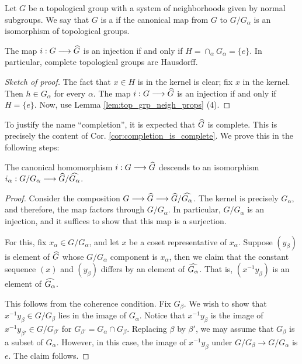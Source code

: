 \begin{defn}
Let $G$ be a topological group with a system of neighborhoods
given by normal subgroups. We say that $G$ is a  if the canonical
map from $G$ to $G/G_\alpha$ is an isomorphism of topological
groups.
\end{defn}

\begin{prop}
The map $i: G \longrightarrow \widehat{G}$ is an injection if and only if
$H = \cap_\alpha G_\alpha = \{e\}$. In particular, complete 
topological groups are Hausdorff.
\end{prop}
\begin{proof}[Sketch of proof]
The fact that $x \in H$ is in the kernel is clear; fix $x$ in
the kernel. Then $h \in G_\alpha$ for every $\alpha$. The map $i: 
G \longrightarrow \widehat{G}$ is an injection if and only if $H = \{e\}$. 
Now, use Lemma \ref{lem:top_grp_neigh_props} (4).
\end{proof}

To justify the name ``completion'', it is expected that 
$\widehat{G}$ is complete. This is precisely the content of Cor. 
\ref{cor:completion_is_complete}. We prove this in the following 
steps:

\begin{prop}
The canonical homomorphism $i: G \longrightarrow \widehat{G}$ descends to an 
isomorphism $i_\alpha: G/G_\alpha \longrightarrow 
\widehat{G}/\widehat{G_\alpha}$.
\end{prop}
\begin{proof}
Consider the composition $G \longrightarrow \widehat{G} \longrightarrow 
\widehat{G}/\widehat{G_\alpha}$. The kernel is precisely 
$G_\alpha$, and therefore, the map factors through $G/G_\alpha$.
In particular, $G/G_\alpha$ is an injection, and it suffices to
show that this map is a surjection.

For this, fix $x_\alpha \in G/G_\alpha$, and let $x$ be a coset
representative of $x_\alpha$. Suppose $(y_\beta)$ is element of
$\widehat{G}$ whose $G/G_\alpha$ component is $x_\alpha$, then
we claim that the constant sequence $(x)$ and $(y_\beta)$ differs
by an element of $\widehat{G_\alpha}$. That is, $(x^{-1}y_\beta)$
is an element of $\widehat{G_\alpha}$.

This follows from the coherence condition. Fix $G_\beta$. We wish
to show that $x^{-1}y_{\beta} \in G/G_\beta$ lies in the image of
$G_\alpha$. Notice that $x^{-1}y_\beta$ is the image of 
$x^{-1}y_{\beta'} \in G/G_{\beta'}$ for $G_{\beta'} = G_\alpha 
\cap G_\beta$. Replacing $\beta$ by $\beta'$, we may assume that 
$G_\beta$ is a subset of $G_\alpha$. However, in this case, the 
image of $x^{-1}y_{\beta}$ under $G/G_{\beta} \to G/G_{\alpha}$ is 
$e$. The claim follows.
\end{proof}

